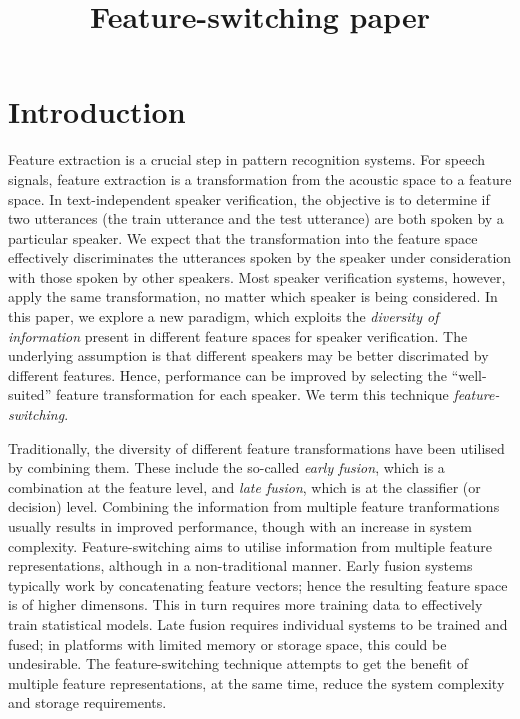 \documentclass{article}
\title{Feature-switching paper}
\begin{document}
\section{Introduction}
Feature extraction is a crucial step in pattern recognition systems. For
speech signals, feature extraction is a transformation from the acoustic space
to a feature space. In text-independent speaker verification, the objective is
to determine if two utterances (the train utterance and the test utterance) are
both spoken by a particular speaker. We expect that the transformation into the
feature space effectively discriminates the utterances spoken by the speaker
under consideration with those spoken by other speakers. Most speaker
verification systems, however, apply the same transformation, no matter which
speaker is being considered. In this paper, we explore a new paradigm, which
exploits the \emph{diversity of information} present in different feature spaces
for speaker verification. The underlying assumption is that different speakers
may be better discrimated by different features. Hence, performance can
be improved by selecting the ``well-suited'' feature transformation for
each speaker. We term this technique \emph{feature-switching}. 

Traditionally, the diversity of different feature transformations have been
utilised by combining them. These include the so-called \emph{early fusion},
which is a combination at the feature level, and \emph{late fusion}, which is at
the classifier (or decision) level. Combining the information from multiple
feature tranformations usually results in improved performance, though
with an increase in system complexity. Feature-switching aims to utilise
information from multiple feature representations, although in a non-traditional
manner. Early fusion systems typically work by concatenating feature vectors;
hence the resulting feature space is of higher dimensons. This in turn requires
more training data to effectively train statistical models. Late fusion requires
individual systems to be trained and fused; in platforms with limited memory or
storage space, this could be undesirable. The feature-switching technique
attempts to get the benefit of multiple feature representations, at the same
time, reduce the system complexity and storage requirements.
\end{document}
